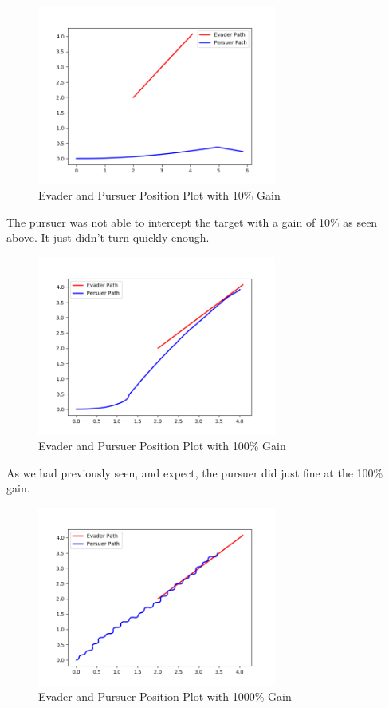 \documentclass{article}
\begin{document}
\bigskip
\begin{figure}[H]
\centering
\includegraphics[width=0.7\textwidth]{images/question2a.png}
\caption{Evader and Pursuer Position Plot with 10\% Gain}
\label{fig:question2}
\end{figure}

\bigskip
\noindent The pursuer was not able to intercept the target with a gain of 10\% as seen above. It just didn't turn quickly enough.



\begin{figure}[H]
\centering
\includegraphics[width=0.7\textwidth]{images/question2b.png}
\caption{Evader and Pursuer Position Plot with 100\% Gain}
\label{fig:question2}
\end{figure}

\bigskip
\noindent As we had previously seen, and expect, the pursuer did just fine at the 100\% gain.


\begin{figure}[H]
\centering
\includegraphics[width=0.7\textwidth]{images/question2c.png}
\caption{Evader and Pursuer Position Plot with 1000\% Gain}
\label{fig:question2}
\end{figure}
\end{document}
